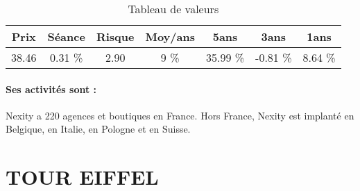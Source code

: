 \documentclass[11pt,a4paper]{report}%
\begin{document}
\begin{table}[H]
  \centering
    \begin{tabular}{|c|c|c|c|c|c|c|}
    \hline
    Prix & Séance & Risque  & Moy/ans & 5ans & 3ans & 1ans \\
    \hline
    38.46 &    0.31 \%    & 2.90 & 9 \% & 35.99 \% & -0.81 \% & 8.64 \% \\
    \hline
    \end{tabular}%
        \label{tab:table_NEXITY}%
      \caption{Tableau de valeurs}
\end{table}%

\paragraph{Ses activités sont : } Nexity a 220 agences et boutiques en France. Hors France, Nexity est implanté en Belgique, en Italie, en Pologne et en Suisse. 
    
    \newpage

\section{TOUR EIFFEL}
\end{document}
